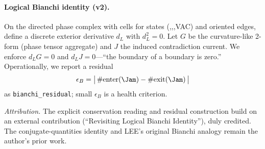 
\paragraph{Logical Bianchi identity (v2).}
On the directed phase complex with cells for states (\Alive,\Jam,\Mem,\textsf{VAC}) and oriented edges, define a discrete exterior derivative $d_L$ with $d_L^2=0$.
Let $G$ be the curvature-like 2-form (phase tensor aggregate) and $J$ the induced contradiction current.
We enforce $d_L G = 0$ and $d_L J = 0$—``the boundary of a boundary is zero.''
Operationally, we report a residual
\[
\epsilon_B = \big|\,\#\mathrm{enter}(\Jam) - \#\mathrm{exit}(\Jam)\,\big|
\]
as \texttt{bianchi\_residual}; small $\epsilon_B$ is a health criterion.

\textit{Attribution.} The explicit conservation reading and residual construction build on an external contribution (“Revisiting Logical Bianchi Identity”), duly credited. The conjugate-quantities identity and LEE’s original Bianchi analogy remain the author’s prior work.
